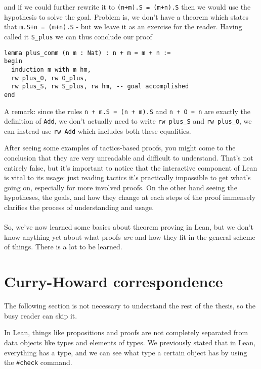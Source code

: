 \documentclass{book}
\theoremstyle{definition}
\theoremstyle{remark}
\theoremstyle{plain}
\begin{document}
and if we could further rewrite it to \lstinline{(n+m).S = (m+n).S} then we would use the hypothesis
to solve the goal.
Problem is, we don't have a theorem which states that \lstinline{m.S+n = (m+n).S} - but we leave it as an exercise for the reader.
Having called it \lstinline{S_plus} we can thus conclude our proof
\begin{lstlisting}
lemma plus_comm (n m : Nat) : n + m = m + n :=
begin
  induction m with m hm,
  rw plus_O, rw O_plus,
  rw plus_S, rw S_plus, rw hm, -- goal accomplished
end
\end{lstlisting}
A remark: since the rules \lstinline{n + m.S = (n + m).S} and \lstinline{n + O = n} are exactly the definition of \lstinline{Add},
we don't actually need to write \lstinline{rw plus_S} and \lstinline{rw plus_O}, we can instead use \lstinline{rw Add}
which includes both these equalities.

After seeing some examples of tactics-based proofs,
you might come to the conclusion that they are very unreadable and difficult to understand.
That's not entirely false, but it's important to notice that the interactive component of Lean is vital to its usage:
just reading tactics it's practically impossible to get what's going on, especially for more involved proofs.
On the other hand seeing the hypotheses, the goals, and how they change at each steps of the proof
immensely clarifies the process of understanding and usage.

\paragraph{}

So, we've now learned some basics about theorem proving in Lean,
but we don't know anything yet about what proofs \textit{are} and how they fit in the general scheme of things.
There is a lot to be learned.

\section{Curry-Howard correspondence}

The following section is not necessary to understand the rest of the thesis,
so the busy reader can skip it.

In Lean, things like propositions and proofs are not completely separated from data objects like types and elements of types.
We previously stated that in Lean, everything has a type, and we can see what type a certain object has by using the \lstinline{#check} command.
\end{document}
